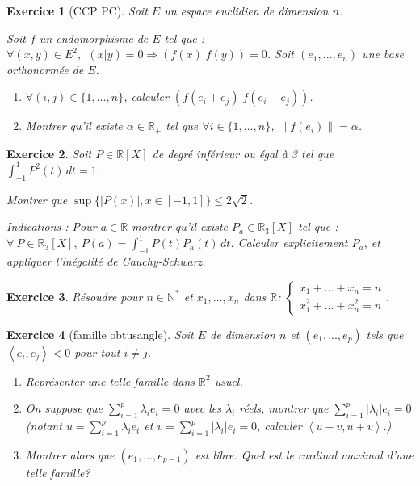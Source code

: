 \documentclass[12pt,a4paper]{article}
\newcommand{\ps}[2]{\left\langle#1,#2\right\rangle}
\newcommand{\R}{\mathbb{R}}
\newcommand{\N}{\mathbb{N}}
\theoremstyle{break}
\newtheorem{Exo}{Exercice}
\begin{document}
\begin{Exo}[CCP PC]
	Soit $E$ un espace euclidien de dimension $n$.
	
	Soit $f$ un endomorphisme de $E$ tel que : $\forall(x,y)\in E^{2},\ \ (x|y)=0\Rightarrow(f(x)|f(y))=0$.
	Soit $(e_{1},\ldots,e_{n})$ une base orthonormée de $E$. 
	\begin{enumerate}
		\item
		$\forall(i,j)\in\{1,\ldots,n\}$, calculer $(f(e_{i}+e_{j})|f(e_{i}-e_{j}))$.
		\item
		Montrer qu'il existe $\alpha\in\mathbb{R_{+}}$ tel que $\forall i\in\{1,\ldots,n\}$, $\|f(e_{i})\|=\alpha$.
	\end{enumerate}
\end{Exo}


\begin{Exo}
Soit $P \in \R[X]$ de degré inférieur ou égal à 3 tel que
$ \int_{-1}^1 P^2(t)\,d t = 1$.

Montrer que $\sup\{ |P(x)|,x\in [-1,1]\} \leqslant 2\sqrt2$.

Indications : Pour $a\in\R$ montrer qu'il existe $P_a\in\R_3[X]$ tel que :
$\forall\ P\in\R_3[X],\ P(a) =  \int_{-1}^1 P(t)P_a(t)\,d t$.
Calculer explicitement $P_a$, et appliquer l'inégalité de Cauchy-Schwarz.
\end{Exo}

\begin{Exo}
	Résoudre pour $n\in \N^*$ et $x_1,...,x_n$ dans $\R$:
	$\begin{cases}
		x_1+...+x_n=n\\x_1^2+...+x_n^2=n
	\end{cases}$.
\end{Exo}

\begin{Exo}[famille obtusangle]
	Soit $E$ de dimension $n$ et $(e_1,...,e_p)$ tels que $\ps{e_i}{e_j}<0$ pour tout $i\neq j$.
	\begin{enumerate}
		\item
		Représenter une telle famille dans $\R^2$ usuel.
		\item
		On suppose que $\sum_{i=1}^{p}\lambda_i e_i=0$ avec les $\lambda_i$ réels, montrer que $\sum_{i=1}^{p}|\lambda_i| e_i=0$ (notant $u=\sum_{i=1}^{p}\lambda_i e_i$ et $v=\sum_{i=1}^{p}|\lambda_i| e_i=0$, calculer $\ps{u-v}{u+v}$.)
		\item
		Montrer alors que $(e_1,...,e_{p-1})$ est libre. Quel est le cardinal maximal d'une telle famille?
	\end{enumerate}
\end{Exo}
\end{document}
